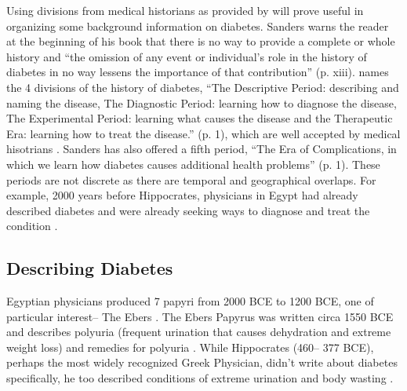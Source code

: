 \documentclass[12pt]{article}
\begin{document}
Using divisions from medical historians as provided by \citet{sanders_2001_philatelic} will prove useful in organizing some background information on diabetes. Sanders warns the reader at the beginning of his book that there is no way to provide a complete or whole history and ``the omission of any event or individual's role in the history of diabetes in no way lessens the importance of that contribution'' (p. xiii). 
\citet{sanders_2001_philatelic} names the 4 divisions of the history of diabetes, ``The Descriptive Period: describing and naming the disease, The Diagnostic Period: learning how to diagnose the disease, The Experimental Period: learning what causes the disease and the Therapeutic Era: learning how to treat the disease.'' (p. 1), which are well accepted by medical hisotrians \citep{papaspyros_1964_history}. Sanders has also offered a fifth period, ``The Era of Complications, in which we learn how diabetes causes additional health problems'' (p. 1). These periods are not discrete as there are temporal and geographical overlaps. For example, 2000 years before Hippocrates, physicians in Egypt had already described diabetes and were already seeking ways to diagnose and treat the condition \citep{sanders_2001_philatelic}. 

\subsection{Describing Diabetes}

Egyptian physicians produced 7 papyri from 2000 BCE to 1200 BCE, one of particular interest-- The Ebers \citep{bryan_1974_ancient}. The Ebers Papyrus was written circa 1550 BCE and describes polyuria (frequent urination that causes dehydration and extreme weight loss) and remedies for polyuria \citep{bryan_1974_ancient}. 
While Hippocrates (460-- 377 BCE), perhaps the most widely recognized Greek Physician, didn't write about diabetes specifically, he too described conditions of extreme urination and body wasting \citep{avicenna_1930_treatise}. 
\end{document}
